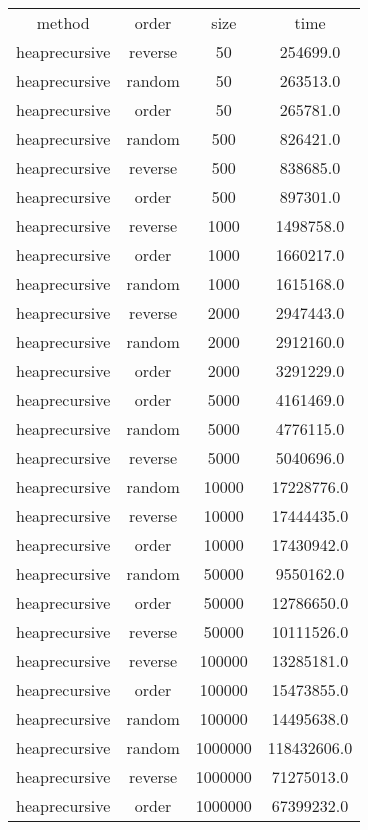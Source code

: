 \begin{table}
\begin{tabular}{cccc}
method & order & size & time \\
heaprecursive & reverse & 50 & 254699.0 \\
heaprecursive & random & 50 & 263513.0 \\
heaprecursive & order & 50 & 265781.0 \\
heaprecursive & random & 500 & 826421.0 \\
heaprecursive & reverse & 500 & 838685.0 \\
heaprecursive & order & 500 & 897301.0 \\
heaprecursive & reverse & 1000 & 1498758.0 \\
heaprecursive & order & 1000 & 1660217.0 \\
heaprecursive & random & 1000 & 1615168.0 \\
heaprecursive & reverse & 2000 & 2947443.0 \\
heaprecursive & random & 2000 & 2912160.0 \\
heaprecursive & order & 2000 & 3291229.0 \\
heaprecursive & order & 5000 & 4161469.0 \\
heaprecursive & random & 5000 & 4776115.0 \\
heaprecursive & reverse & 5000 & 5040696.0 \\
heaprecursive & random & 10000 & 17228776.0 \\
heaprecursive & reverse & 10000 & 17444435.0 \\
heaprecursive & order & 10000 & 17430942.0 \\
heaprecursive & random & 50000 & 9550162.0 \\
heaprecursive & order & 50000 & 12786650.0 \\
heaprecursive & reverse & 50000 & 10111526.0 \\
heaprecursive & reverse & 100000 & 13285181.0 \\
heaprecursive & order & 100000 & 15473855.0 \\
heaprecursive & random & 100000 & 14495638.0 \\
heaprecursive & random & 1000000 & 118432606.0 \\
heaprecursive & reverse & 1000000 & 71275013.0 \\
heaprecursive & order & 1000000 & 67399232.0 \\
\end{tabular}
\end{table}
